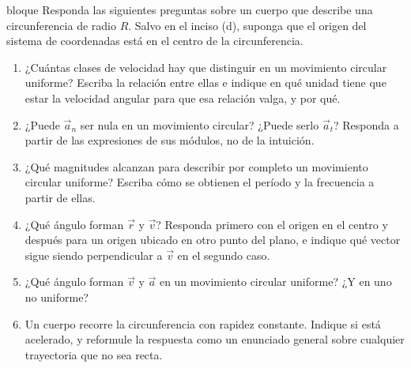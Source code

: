 \documentclass[11pt,openany]{book}
\begin{document}
\begin{ejercicio}{bloque}
Responda las siguientes preguntas sobre un cuerpo que describe una circunferencia de radio $R$. Salvo en el inciso (d), suponga que el origen del sistema de coordenadas está en el centro de la circunferencia.
\begin{enumerate}[label=(\alph*), leftmargin=1.7em, itemsep=1pt, topsep=3pt]
  \item ¿Cuántas clases de velocidad hay que distinguir en un movimiento circular uniforme? Escriba la relación entre ellas e indique en qué unidad tiene que estar la velocidad angular para que esa relación valga, y por qué.
  \item ¿Puede $\vec a_n$ ser nula en un movimiento circular? ¿Puede serlo $\vec a_t$? Responda a partir de las expresiones de sus módulos, no de la intuición.
  \item ¿Qué magnitudes alcanzan para describir por completo un movimiento circular uniforme? Escriba cómo se obtienen el período y la frecuencia a partir de ellas.
  \item ¿Qué ángulo forman $\vec r$ y $\vec v$? Responda primero con el origen en el centro y después para un origen ubicado en otro punto del plano, e indique qué vector sigue siendo perpendicular a $\vec v$ en el segundo caso.
  \item ¿Qué ángulo forman $\vec v$ y $\vec a$ en un movimiento circular uniforme? ¿Y en uno no uniforme?
  \item Un cuerpo recorre la circunferencia con rapidez constante. Indique si está acelerado, y reformule la respuesta como un enunciado general sobre cualquier trayectoria que no sea recta.
\end{enumerate}
\end{ejercicio}
\end{document}

